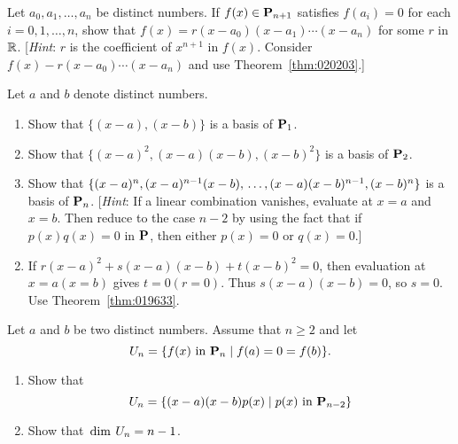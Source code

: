 \begin{multicols}{2}
\begin{ex}
Let $a_{0}, a_{1}, \dots, a_{n}$ be distinct numbers. If $f(x) \in \textbf{P}_{n+1}$ satisfies $f(a_{i}) = 0$ for each $i = 0, 1, \dots, n$, show that $f(x) = r(x - a_{0})(x - a_{1}) \cdots (x - a_{n})$ for some $r$ in $\mathbb{R}$. [\textit{Hint}: $r$ is the coefficient of $x^{n+1}$ in $f(x)$. Consider $f(x) - r(x - a_{0}) \cdots (x - a_{n})$ and use Theorem~\ref{thm:020203}.]
\end{ex}

\begin{ex} \label{ex:6_5_10}
Let $a$ and $b$ denote distinct numbers.

\begin{enumerate}[label={\alph*.}]
\item Show that $\{(x - a), (x - b)\}$ is a basis of $\textbf{P}_{1}$.

\item Show that $\{(x - a)^{2}, (x - a)(x - b), (x - b)^{2}\}$ is a basis of $\textbf{P}_{2}$.

\item Show that $\{(x - a)^{n}, (x - a)^{n-1}(x - b), \\ \dots, (x - a)(x - b)^{n-1}, (x - b)^{n}\}$ is a basis of $\textbf{P}_{n}$. [\textit{Hint}: If a linear combination vanishes, evaluate at $x = a$ and $x = b$. Then reduce to the case $n - 2$ by using the fact that if $p(x)q(x) = 0$ in $\textbf{P}$, then either $p(x) = 0$ or $q(x) = 0$.]

\end{enumerate}
\begin{sol}
\begin{enumerate}[label={\alph*.}]
\setcounter{enumi}{1}
\item  If $r(x - a)^{2} + s(x - a)(x - b) + t(x - b)^{2} = 0$, then evaluation at $x = a (x = b)$ gives $t = 0 (r = 0)$. Thus $s(x - a)(x - b) = 0$, so $s = 0$. Use Theorem~\ref{thm:019633}.

\end{enumerate}
\end{sol}
\end{ex}

\begin{ex}
Let $a$ and $b$ be two distinct numbers. Assume that $n \geq 2$ and let
\begin{equation*}
U_n = \{f(x) \mbox{ in } \textbf{P}_n \mid f(a) = 0 = f(b) \}.
\end{equation*}
\begin{enumerate}[label={\alph*.}]
\item Show that
\begin{equation*}
U_n = \{(x - a)(x - b)p(x) \mid p(x) \mbox{ in } \textbf{P}_{n - 2} \}
\end{equation*}
\item Show that $\thinspace\operatorname{dim\medspace} U_{n} = n - 1$.


\end{enumerate}
\end{ex}
\end{multicols}
